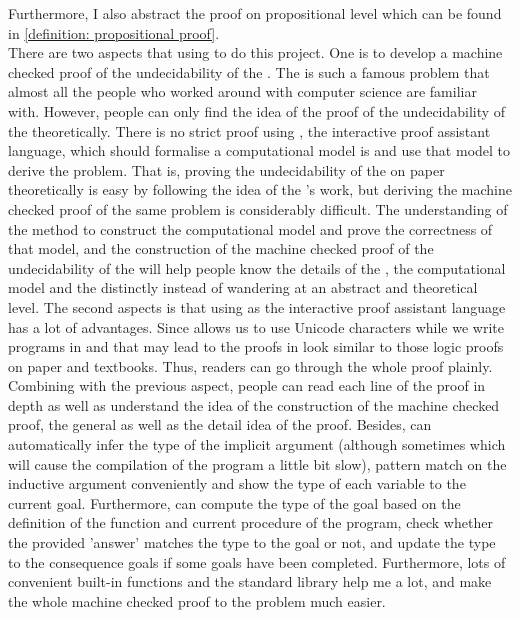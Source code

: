 Furthermore, I also abstract the proof on propositional level which can be found in \ref{definition: propositional proof}.\\
There are two aspects that using \Agda to do this project. One is to develop a machine checked proof of the undecidability of the .
The  is such a famous problem that almost all the people who worked around with computer science are familiar with.
However, people can only find the idea of the proof of the undecidability of the  theoretically.
There is no strict proof using , the interactive proof assistant language, which should formalise a computational model is  and use that model to derive the problem.
That is, proving the undecidability of the  on paper theoretically is easy by following the idea of the 's work\cite{_halting_2015}, 
but deriving the machine checked proof of the same problem is considerably difficult.
The understanding of the method to construct the  computational model and prove the correctness of that model, and the construction of the machine checked proof of the undecidability of the 
will help people know the details of the , the computational model and the  distinctly instead of wandering at an abstract and theoretical level. 
The second aspects is that using \Agda as the interactive proof assistant language has a lot of advantages.
Since \Agda allows us to use Unicode characters while we write programs in  and that may lead to the proofs in \Agda look similar to those logic proofs on paper and textbooks.
Thus, readers can go through the whole proof plainly.
Combining with the previous aspect, people can read each line of the proof in depth as well as understand the idea of the construction of the machine checked proof, the general as well as the detail idea of the proof.
Besides, \Agda can automatically infer the type of the implicit argument (although sometimes which will cause the compilation of the program a little bit slow), pattern match on the inductive argument conveniently and show the type of each variable to the current goal.
Furthermore, \Agda can compute the type of the goal based on the definition of the function and current procedure of the program, check whether the provided 'answer' matches the type to the goal or not, 
and update the type to the consequence goals if some goals have been completed.
Furthermore, lots of convenient built-in functions and the standard \Agda library help me a lot, and make the whole machine checked proof to the problem much easier.\\
